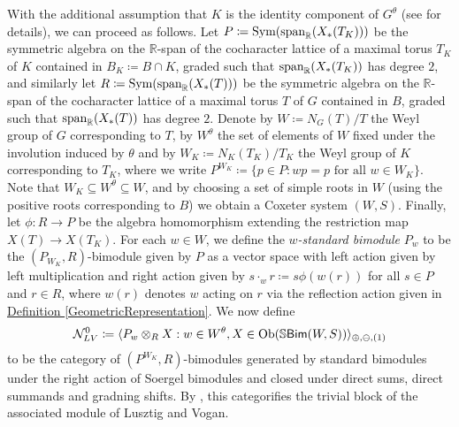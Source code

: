\noindent With the additional assumption that $K$ is the identity component of $G^\theta$ (see \cite{LR22} for details), we can proceed as follows. Let $P \coloneqq \textnormal{Sym}(\textnormal{span}_\mathbb{R}(X_*(T_K)))$ be the symmetric algebra on the $\mathbb{R}$-span of the cocharacter lattice of a maximal torus $T_K$ of $K$ contained in $B_K \coloneqq B \cap K$, graded such that $\textnormal{span}_\mathbb{R}(X_*(T_K))$ has degree $2$, and similarly let $R \coloneqq \textnormal{Sym}(\textnormal{span}_\mathbb{R}(X_*(T)))$ be the symmetric algebra on the $\mathbb{R}$-span of the cocharacter lattice of a maximal torus $T$ of $G$ contained in $B$, graded such that $\textnormal{span}_\mathbb{R}(X_*(T))$ has degree $2$. Denote by $W \coloneqq N_G(T)/T$ the Weyl group of $G$ corresponding to $T$, by $W^\theta$ the set of elements of $W$ fixed under the involution induced by $\theta$ and by $W_K \coloneqq N_K(T_K)/T_K$ the Weyl group of $K$ corresponding to $T_K$, where we write $P^{W_K} \coloneqq \{p \in P : wp = p\text{ for all }w \in W_K\}$. Note that $W_K \subseteq W^\theta \subseteq W$, and by choosing a set of simple roots in $W$ (using the positive roots corresponding to $B$) we obtain a Coxeter system $(W, S)$. Finally, let $\phi : R \to P$ be the algebra homomorphism extending the restriction map $X(T) \to X(T_K)$. For each $w \in W$, we define the {\em $w$-standard bimodule} $P_w$ to be the $(P_{W_K}, R)$-bimodule given by $P$ as a vector space with left action given by left multiplication and right action given by $s\cdot_w r \coloneqq s\phi(w(r))$ for all $s \in P$ and $r \in R$, where $w(r)$ denotes $w$ acting on $r$ via the reflection action given in \hyperref[GeometricRepresentation]{Definition \ref*{GeometricRepresentation}}. We now define\\[-1.1\linespacing]
\begin{align*}
\begin{split}
\mathcal{N}_{LV}^0 \coloneqq \langle P_w \otimes_R X : w \in W^\theta, X \in \textnormal{Ob}(\mathbb{S}\textnormal{\textsf{Bim}}(W, S))\rangle_{\oplus,\ominus,(1)}
\end{split}
\end{align*}
\noindent to be the category of $(P^{W_K}, R)$-bimodules generated by standard bimodules under the right action of Soergel bimodules and closed under direct sums, direct summands and gradning shifts. By \cite[Theorem 1.3.1]{LR22}, this categorifies the trivial block of the associated module of Lusztig and Vogan.\\

